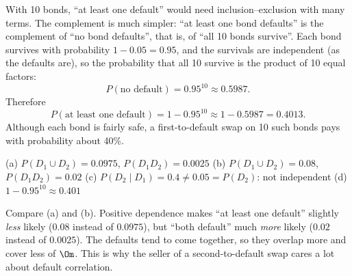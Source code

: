 \begin{solution}
	 With 10 bonds, ``at least one default'' would need
	inclusion--exclusion with many terms. The complement is much simpler: ``at
	least one bond defaults'' is the complement of ``no bond defaults'', that
	is, of ``all 10 bonds survive''. Each bond survives with probability
	$1-0.05=0.95$, and the survivals are independent (as the defaults are), so
	the probability that all 10 survive is the product of 10 equal factors:
	\[ P(\text{no default})=0.95^{10}\approx0.5987. \]
	Therefore
	\[ P(\text{at least one default})=1-0.95^{10}\approx1-0.5987=0.4013. \]
	Although each bond is fairly safe, a first-to-default swap on 10 such
	bonds pays with probability about 40\%.
	\begin{answer}
		(a) $P(D_1\cup D_2)=0.0975$, $P(D_1D_2)=0.0025$ \quad
		(b) $P(D_1\cup D_2)=0.08$, $P(D_1D_2)=0.02$ \quad
		(c) $P(D_2\mid D_1)=0.4\ne0.05=P(D_2)$: not independent \quad
		(d) $1-0.95^{10}\approx0.401$
	\end{answer}
	\begin{remark}
		Compare (a) and (b). Positive dependence makes ``at least one default''
		slightly \emph{less} likely ($0.08$ instead of $0.0975$), but ``both
		default'' much \emph{more} likely ($0.02$ instead of $0.0025$). The
		defaults tend to come together, so they overlap more and cover less of
		$\Om$. This is why the seller of a second-to-default swap cares a lot
		about default correlation.
	\end{remark}
\end{solution}
